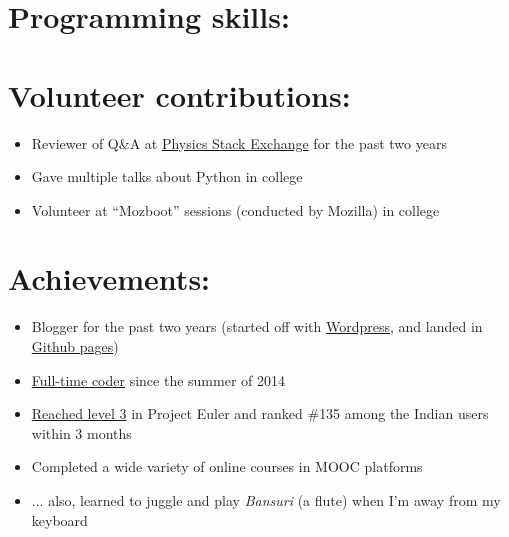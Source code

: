 \documentclass[11pt,a4paper,sans]{moderncv}        %
\newcommand\chref[3][linky]{\href{#2}{\color{#1}#3}}
\begin{document}

\section{Programming skills:}

\section{Volunteer contributions:}
\begin{itemize}
\item Reviewer of Q{\&}A at \chref{https://physics.stackexchange.com/users/11062/waffles-crazy-peanut}{Physics Stack Exchange} for the past two years
\item Gave multiple talks about Python in college
\item Volunteer at ``Mozboot'' sessions (conducted by Mozilla) in college
\end{itemize}

\section{Achievements:}
\begin{itemize}
\item Blogger for the past two years (started off with \chref{https://wafflescrazypeanut.wordpress.com/}{Wordpress}, and landed in \chref{https://wafflespeanut.github.io/}{Github pages})
\item \chref{https://github.com/Wafflespeanut}{Full-time coder} since the summer of 2014
\item \chref{https://projecteuler.net/profile/Wafflespeanut.png}{Reached level 3} in Project Euler and ranked {\#}135 among the Indian users within 3 months
\item Completed a wide variety of online courses in MOOC platforms
\item ... also, learned to juggle and play \textit{Bansuri} (a flute) when I'm away from my keyboard
\end{itemize}

\end{document}

